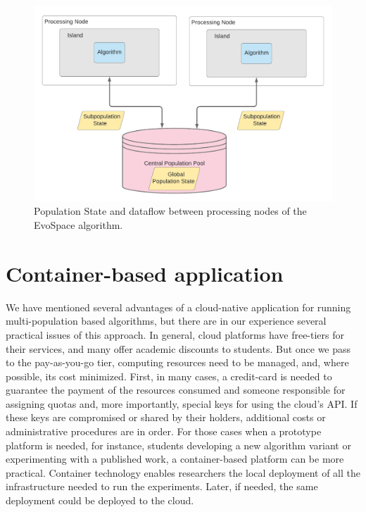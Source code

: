 \documentclass[review]{elsarticle}
\begin{document}
\begin{figure}[ht]
    \centering
    \includegraphics[width=\textwidth]{population_pool}
    \caption{Population State and dataflow between processing nodes of the EvoSpace algorithm.}
    \label{fig:population_pool}
\end{figure}

\section{Container-based application} 
\label{docker}

We have mentioned several advantages of a cloud-native application for running
multi-population based algorithms, but there are in our experience several
practical issues of this approach. In general, cloud platforms have free-tiers
for their services, and many offer academic discounts to students. But once we
pass to the pay-as-you-go tier, computing resources need to be
managed, and, where possible, its cost minimized.  First,
in many cases,  a credit-card is needed to guarantee the payment of the
resources consumed and someone responsible for assigning quotas and, more
importantly, special keys for using the cloud's API.  If these keys are
compromised or shared by their holders,  additional costs or administrative
procedures are in order. For those cases when a prototype platform is needed,
for instance, students developing a new algorithm variant or experimenting with
a published work, a container-based platform can be more practical. Container
technology enables researchers the local deployment of all the infrastructure
needed to run the experiments. Later, if needed, the same deployment could be
deployed to the cloud.
\end{document}
